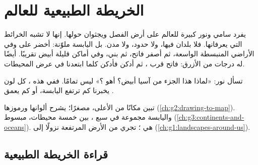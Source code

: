 \chapter{الخريطة الطبيعية للعالم}\label{ch:g4:world-physical-map}

يفرد سامي ونور  كبيرة للعالم على أرض الفصل ويجثوان حولها. إنها لا
تشبه الخرائط التي يعرفانها. فلا بلدان فيها، ولا حدود، ولا مدن. بل اليابسة
ملوّنة: أخضر على  وفي الأراضي المنبسطة الواسعة، ثم أصفر فاتح، ثم
بني، وفي أماكن قليلة أبيض تقريبًا.  أيضًا له درجات من الأزرق: فاتح
قرب ، ثم أدكن فأدكن كلما ابتعدنا في عرض
المحيطات.

تسأل نور: «لماذا هذا الجزء من آسيا أبيض؟ أهو ؟» ليس تمامًا. ففي هذه
، كل لون يخبرنا كم ترتفع اليابسة، أو كم يعمق .

\begin{recall}
 تبين مكانًا من الأعلى، مصغرًا؛  يشرح ألوانها ورموزها
(\cref{ch:g2:drawing-to-map}). واليابسة مجموعة في سبع ، بين خمسة
محيطات،   مبسوط
(\cref{ch:g3:continents-and-oceans}).     هي
؛  تجري من الأرض المرتفعة نزولًا إلى 
(\cref{ch:g1:landscapes-around-us}).
\end{recall}

\section{قراءة الخريطة الطبيعية}

